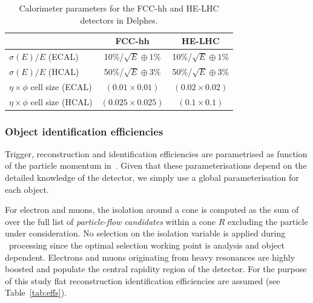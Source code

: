 \documentclass[a4paper,11pt]{article}
\begin{document}
\begin {table}[htb!]
\begin{center}
\begin{tabular}{l||c|c}
& FCC-hh & HE-LHC  \\
  \hline
  \hline
$\sigma(E)/E $ (ECAL)& 10\%/$\sqrt{E} \oplus 1\%$ &  10\%/$\sqrt{E} \oplus 1\%$\\
   \hline
$\sigma(E)/E $ (HCAL)& 50\%/$\sqrt{E} \oplus 3\%$  &  50\%/$\sqrt{E} \oplus 3\%$\\
  \hline
  \hline
$\eta \times \phi$ cell size (ECAL)& $(0.01\times0.01)$ &  $(0.02\times0.02)$\\
  \hline
 $\eta \times \phi$ cell size  (HCAL)& $(0.025\times0.025)$ & $(0.1\times0.1)$
\end{tabular}
\caption{Calorimeter parameters for the FCC-hh and HE-LHC detectors in Delphes.}
\label{tab:cal_param}
\end{center}
\end{table}

\subsubsection{Object identification efficiencies}
\label{appsub:objid}

Trigger, reconstruction and identification efficiencies are parametrised as function of the particle momentum in~\delphes{}. Given that these parameterisations depend on the detailed knowledge of the detector, we simply use a global parameterisation for each object.

For electron and muons, the isolation around a cone is computed as the sum of over the full list of \emph{particle-flow candidates} within a cone $R$ excluding the particle under consideration. No selection on the isolation variable is applied during \delphes\ processing since the optimal selection working point is analysis and object dependent. Electrons and muons originating from heavy resonances are highly boosted and populate the central rapidity region of the detector. For the purpose of this study flat reconstruction identification efficiencies are assumed (see Table~\ref{tab:effs}).
\end{document}
